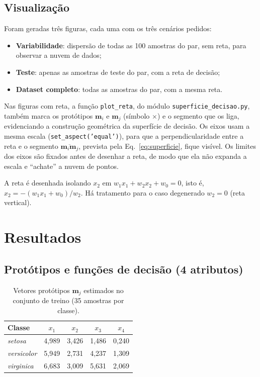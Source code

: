 \documentclass[12pt,a4paper]{article}
\begin{document}
\subsection{Visualização}

Foram geradas três figuras, cada uma com os três cenários pedidos:
\begin{itemize}
  \item \textbf{Variabilidade}: dispersão de todas as 100 amostras do par, sem reta, para observar a nuvem de dados;
  \item \textbf{Teste}: apenas as amostras de teste do par, com a reta de decisão;
  \item \textbf{Dataset completo}: todas as amostras do par, com a mesma reta.
\end{itemize}
Nas figuras com reta, a função \texttt{plot\_reta}, do módulo \texttt{superficie\_decisao.py}, também marca os protótipos $\mathbf{m}_i$ e $\mathbf{m}_j$ (símbolo $\times$) e o segmento que os liga, evidenciando a construção geométrica da superfície de decisão. Os eixos usam a mesma escala (\texttt{set\_aspect('equal')}), para que a perpendicularidade entre a reta e o segmento $\overline{\mathbf{m}_i\mathbf{m}_j}$, prevista pela Eq.~\eqref{eq:superficie}, fique visível. Os limites dos eixos são fixados antes de desenhar a reta, de modo que ela não expanda a escala e ``achate'' a nuvem de pontos.

A reta é desenhada isolando $x_2$ em $w_1x_1 + w_2x_2 + w_0 = 0$, isto é, $x_2 = -(w_1x_1 + w_0)/w_2$. Há tratamento para o caso degenerado $w_2 = 0$ (reta vertical).

\section{Resultados}\label{sec:resultados}

\subsection{Protótipos e funções de decisão (4 atributos)}

\begin{table}[H]
\centering
\caption{Vetores protótipos $\mathbf{m}_j$ estimados no conjunto de treino (35 amostras por classe).}
\label{tab:prototipos}
\begin{tabular}{lcccc}
\toprule
Classe & $x_1$ & $x_2$ & $x_3$ & $x_4$ \\
\midrule
\emph{setosa}     & 4,989 & 3,426 & 1,486 & 0,240 \\
\emph{versicolor} & 5,949 & 2,731 & 4,237 & 1,309 \\
\emph{virginica}  & 6,683 & 3,009 & 5,631 & 2,069 \\
\bottomrule
\end{tabular}
\end{table}
\end{document}
